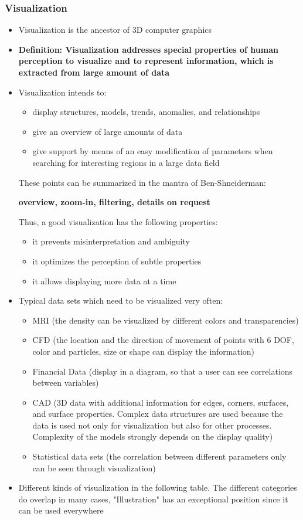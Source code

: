\documentclass{standalone}
\begin{document}
\subsubsection*{Visualization}

\begin{itemize}
	\item Visualization is the ancestor of 3D computer graphics
	\item \textbf {Definition: Visualization addresses special properties of human perception to visualize and to represent information, which is extracted from large amount of data}
	\item Visualization intends to:
	\begin{itemize}
		\item display structures, models, trends, anomalies, and relationships
		\item give an overview of large amounts of data
		\item give support by means of an easy modification of parameters when searching for interesting regions in a large data field
	\end{itemize}
	These points can be summarized in the mantra of Ben-Shneiderman:
	\begin{center}
	\textbf{overview, zoom-in, filtering, details on request}
	\end{center}
	Thus, a good visualization has the following properties:
	\begin{itemize}
		\item it prevents misinterpretation and ambiguity
		\item it optimizes the perception of subtle properties
		\item it allows displaying more data at a time
	\end{itemize}
	\item Typical data sets which need to be visualized very often:
	\begin{itemize}
		\item MRI (the density can be visualized by different colors and transparencies)
		\item CFD (the location and the direction of movement of points with 6 DOF, color and particles, size or shape can display the information)
		\item Financial Data (display in a diagram, so that a user can see correlations between variables)
		\item CAD (3D data with additional information for edges, corners, surfaces, and surface properties. Complex data structures are used because the data is used not only for visualization but also for other processes. Complexity of the models strongly depends on the display quality)
		\item Statistical data sets (the correlation between different parameters only can be seen through visualization)
	\end{itemize}
	\item Different kinds of visualization in the following table. The different categories do overlap in many cases, "Illustration" has an exceptional position since it can be used everywhere
\end{itemize}
\end{document}
